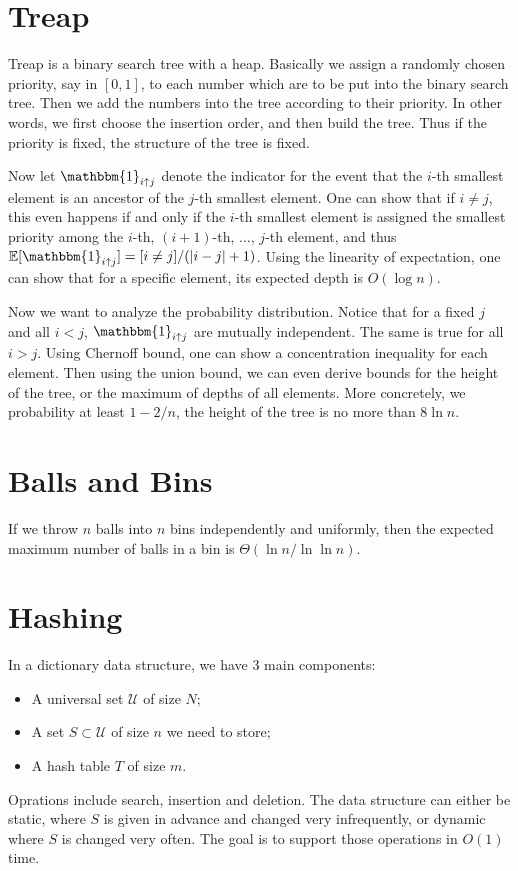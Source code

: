 \documentclass[openany]{book}
\begin{document}
\section{Treap}
Treap is a binary search tree with a heap. Basically we assign a randomly chosen priority, say in $[0,1]$, to each number which are to be put into the binary search tree. Then we add the numbers into the tree according to their priority. In other words, we first choose the insertion order, and then build the tree. Thus if the priority is fixed, the structure of the tree is fixed.

Now let $\mathbbm{1}_{i\uparrow j}$ denote the indicator for the event that the $i$-th smallest element is an ancestor of the $j$-th smallest element. One can show that if $i\ne j$, this even happens if and only if the $i$-th smallest element is assigned the smallest priority among the $i$-th, $(i+1)$-th, $\ldots$, $j$-th element, and thus $\mbb{E}[\mathbbm{1}_{i\uparrow j}]=[i\ne j]/(|i-j|+1)$. Using the linearity of expectation, one can show that for a specific element, its expected depth is $O(\log n)$.

Now we want to analyze the probability distribution. Notice that for a fixed $j$ and all $i<j$, $\mathbbm{1}_{i\uparrow j}$ are mutually independent. The same is true for all $i>j$. Using Chernoff bound, one can show a concentration inequality for each element. Then using the union bound, we can even derive bounds for the height of the tree, or the maximum of depths of all elements. More concretely, we probability at least $1-2/n$, the height of the tree is no more than $8\ln n$.

\section{Balls and Bins}
If we throw $n$ balls into $n$ bins independently and uniformly, then the expected maximum number of balls in a bin is $\Theta(\ln n/\ln\ln n)$.

\section{Hashing}
In a dictionary data structure, we have 3 main components:
\begin{itemize}
    \item A universal set $\mathcal{U}$ of size $N$;
    \item A set $S\subset \mathcal{U}$ of size $n$ we need to store;
    \item A hash table $T$ of size $m$.
\end{itemize}
Oprations include search, insertion and deletion. The data structure can either be static, where $S$ is given in advance and changed very infrequently, or dynamic where $S$ is changed very often. The goal is to support those operations in $O(1)$ time.
\end{document}
